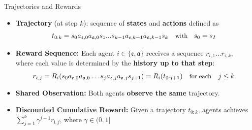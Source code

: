 \documentclass[10pt, aspectratio=169]{beamer}
\newcommand{\evidenzia}[1]{\textcolor{verdeSalvia}{\textbf{#1}}}
\begin{document}
\begin{frame}{Trajectories and Rewards}
    \begin{itemize}
        \item \textbf{Trajectory} (at step \evidenzia{$k$}):  sequence of \evidenzia{states} and \evidenzia{actions} defined as $$t_{0:k} = s_{0}a_{\mathfrak{e},0}a_{\mathfrak{a},0}s_{1}...s_{k-1}a_{\mathfrak{e},k-1}a_{\mathfrak{a},k-1}s_{k}\quad \text{\small with}\quad \text s_0 = s_{I}$$
        \item \textbf{Reward Sequence:} Each agent $i \in \{\mathfrak{e}, \mathfrak{a}\}$ receives a sequence $r_{i,1}\dots r_{i,k}$, where each value is determined by the \evidenzia{history up to that step}:
        $$r_{i,j} = R_i(s_{0}a_{\mathfrak{e},0}a_{\mathfrak{a},0}\dots s_{j}a_{\mathfrak{e},j}a_{\mathfrak{a},j}s_{j+1})=R_i(t_{0:j+1}) \quad \text{\small for each} \quad j \le k$$
        \item \textbf{Shared Observation:} Both agents \evidenzia{observe the same} trajectory.
        \item \textbf{Discounted Cumulative Reward:} Given a trajectory $t_{0:k}$, %
        agents achieves $\sum_{j=1}^{k} \gamma^{j-1} r_{\mathfrak{i},j}$, where $ \gamma \in (0,1]$ %
    \end{itemize}
\end{frame}
\end{document}
